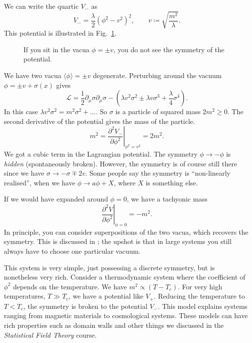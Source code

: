 We can write the quartic $V_-$ as 
\begin{equation}
  V_- = \frac{\lambda}{2} \left( \phi^2 - v^2 \right)^2, \qquad v \coloneqq \sqrt{\frac{m^2}{\lambda}}.
\end{equation}
This potential is illustrated in Fig.~\ref{fig:l14f2}.
\begin{figure}[tbhp]
  \centering
  \def\svgwidth{0.4\columnwidth}
  
  \caption{If you sit in the vacua $\phi = \pm v$, you do not see the symmetry of the potential.}
  \label{fig:l14f2}
\end{figure}
We have two vacua $\langle \phi \rangle = \pm v$ degenerate.
Perturbing around the vacuum $\phi = \pm v + \sigma(x)$ gives
\begin{equation}
  \mathscr{L} = \frac{1}{2} \partial_{\mu} \sigma \partial_{\mu} \sigma - \left( \lambda v^2 \sigma^2 \pm \lambda v \sigma^3 + \frac{\lambda}{4} \sigma^4 \right).
\end{equation}
In this case $\lambda v^2 \sigma^2 = m^2 \sigma^2 + \dots$. So $\sigma$ is a particle of squared mass $2m^2 \geq 0$.
The second derivative of the potential gives the mass of the particle.
\begin{equation}
  m^2 = \left.\frac{\partial^2 V_-}{\partial \phi^2} \right\rvert_{\phi^2 = v^2} = 2 m^2.
\end{equation}
We got a cubic term in the Lagrangian potential.
The symmetry $\phi \to -\phi$ is \emph{hidden} (spontaneously broken).
However, the symmetry is of course still there since we have $\sigma \to -\sigma \mp 2v$. Some people say the symmetry is ``non-linearly realised'', when we have $\phi \to a\phi + X$, where $X$ is something else.

If we would have expanded around $\phi = 0$, we have a tachyonic mass 
\begin{equation}
  \left.\frac{\partial^2 V}{\partial \phi^2} \right\rvert_{\phi = 0} = - m^2.
\end{equation}
In principle, you can consider superpositions of the two vacua, which recovers the symmetry.
This is discussed in \cite[Vol.~2]{weinberg}; the upshot is that in large systems you still always have to choose one particular vacuum.

This system is very simple, just possessing a discrete symmetry, but is nonetheless very rich.
Consider a thermodynamic system where the coefficient of $\phi^2$ depends on the temperature.
We have $m^2 \propto (T - T_c)$.
For very high temperatures, $T \gg T_c$, we have a potential like $V_+$. Reducing the temperature to $T < T_c$, the symmetry is broken to the potential $V_-$.
This model explains systems ranging from magnetic materials to cosmological systems.
These models can have rich properties such as domain walls and other things we discussed in the \emph{Statistical Field Theory} course.
